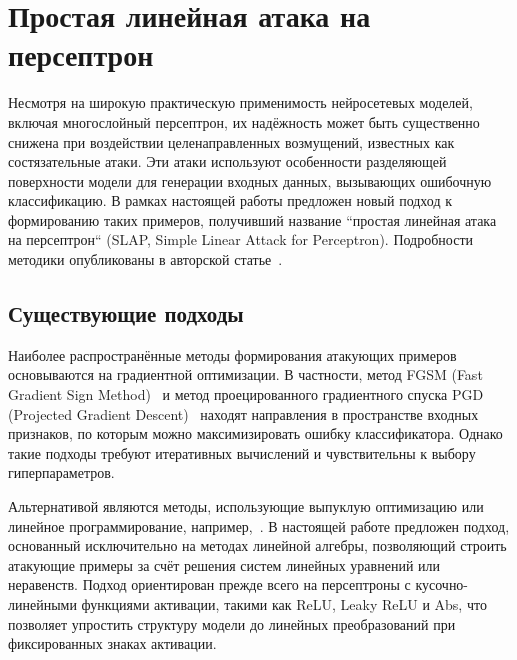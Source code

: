 \section{Простая линейная атака на персептрон}\label{sec:ch1/slap}

Несмотря на широкую практическую применимость нейросетевых моделей, включая многослойный персептрон, их надёжность может быть существенно снижена при воздействии целенаправленных возмущений, известных как состязательные атаки. Эти атаки используют особенности разделяющей поверхности модели для генерации входных данных, вызывающих ошибочную классификацию. В рамках настоящей работы предложен новый подход к формированию таких примеров, получивший название ``простая линейная атака на персептрон`` (SLAP, Simple Linear Attack for Perceptron). Подробности методики опубликованы в авторской статье~\cite{perminov2024slap}.


\subsection{Существующие подходы}

Наиболее распространённые методы формирования атакующих примеров основываются на градиентной оптимизации. В частности, метод FGSM (Fast Gradient Sign Method)~\cite{goodfellow2014explaining} и метод проецированного градиентного спуска PGD (Projected Gradient Descent)~\cite{madry2017towards} находят направления в пространстве входных признаков, по которым можно максимизировать ошибку классификатора. Однако такие подходы требуют итеративных вычислений и чувствительны к выбору гиперпараметров.

Альтернативой являются методы, использующие выпуклую оптимизацию или линейное программирование, например,~\cite{croce2019sparse, wong2018provable}. В настоящей работе предложен подход, основанный исключительно на методах линейной алгебры, позволяющий строить атакующие примеры за счёт решения систем линейных уравнений или неравенств. Подход ориентирован прежде всего на персептроны с кусочно-линейными функциями активации, такими как ReLU, Leaky ReLU и Abs, что позволяет упростить структуру модели до линейных преобразований при фиксированных знаках активации.

